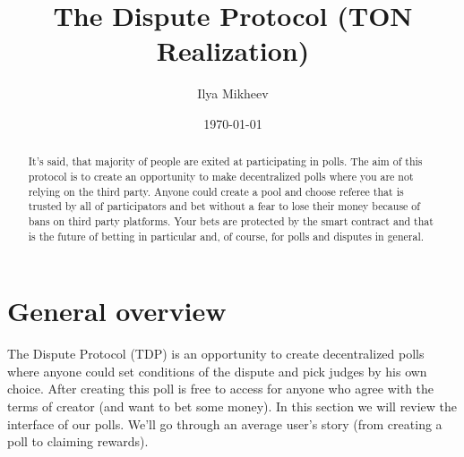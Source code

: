 \documentclass [12pt] {article}
\begin{document}
	
	\title{The Dispute Protocol (TON Realization) \vhCurrentVersion}
	\author {Ilya Mikheev}
	
	\date{\today}
	
	\maketitle
	
	\begin{abstract}
		It's said, that majority of people are exited at participating in polls. The aim of this protocol is to create an opportunity to make decentralized polls where you are not relying on the third party. Anyone could create a pool and choose referee that is trusted by all of participators and bet without a fear to lose their money because of bans on third party platforms. Your bets are protected by the smart contract and that is the future of betting in particular and, of course, for polls and disputes in general.
	\end{abstract}
	
	\vspace{6cm}
	\begin{versionhistory}
		
	\end{versionhistory}
	\clearpage
	
	
	\tableofcontents
	\pagebreak
	
	\section{General overview}
	The Dispute Protocol (TDP) is an opportunity to create decentralized polls where anyone could set conditions of the dispute and pick judges by his own choice. After creating this poll is free to access for anyone who agree with the terms of creator (and want to bet some money). In this section we will review the interface of our polls. We'll go through an average user's story (from creating a poll to claiming rewards).
\end{document}
